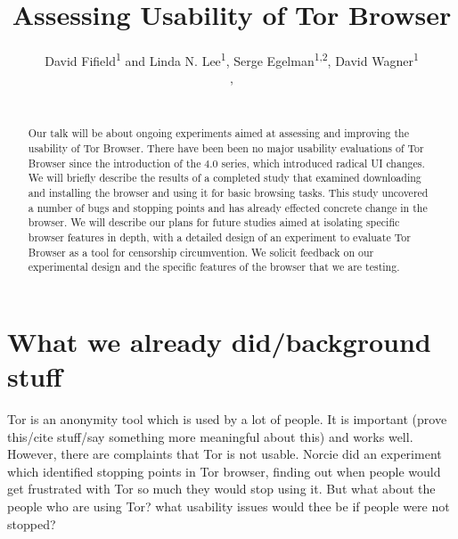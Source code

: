 \documentclass{sig-alternate-hotpets15}
\begin{document}
\title{Assessing Usability of Tor Browser}
\author{
 \alignauthor David Fifield\textsuperscript{1} and Linda N. Lee\textsuperscript{1}, Serge Egelman\textsuperscript{1,2}, David Wagner\textsuperscript{1}\\
   \vspace{0.5em}
   , \\
   \\
}

\maketitle

\begin{abstract}
Our talk will be about ongoing experiments aimed at
assessing and improving the usability of Tor Browser.
There have been been no major usability evaluations of
Tor Browser since the introduction of the 4.0 series,
which introduced radical UI changes.
We will briefly describe the results of a completed study
that examined downloading and installing the browser
and using it for basic browsing tasks.
This study uncovered a number of bugs and stopping points
and has already effected concrete change in the browser.
We will describe our plans for future studies aimed at
isolating specific browser features in depth,
with a detailed design of an experiment to evaluate
Tor Browser as a tool for censorship circumvention.
We solicit feedback on our experimental design
and the specific features of the browser that we are testing.
\end{abstract}


\section{What we already did/background stuff}
Tor is an anonymity tool which is used by a lot of people. It is important (prove this/cite stuff/say something more meaningful about this) and works well. However, there are complaints that Tor is not usable. Norcie did an experiment \cite{norcie2012eliminating} which identified stopping points in Tor browser, finding out when people would get frustrated with Tor so much they would stop using it. But what about the people who are using Tor? what usability issues would thee be if people were not stopped? 
\end{document}

